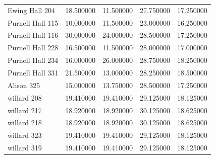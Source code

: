 \documentclass[conference]{IEEEtran}
\begin{document}
\begin{tabular}{lrrrr}
    Ewing Hall 204 & 18.500000 & 11.500000 & 27.750000 & 17.250000 \\
    Purnell Hall 115 & 10.000000 & 11.500000 & 23.000000 & 16.250000 \\
    Purnell Hall 116 & 30.000000 & 24.000000 & 28.500000 & 17.250000 \\
    Purnell Hall 228 & 16.500000 & 11.500000 & 28.000000 & 17.000000 \\
    Purnell Hall 234 & 16.000000 & 26.000000 & 28.750000 & 18.250000 \\
    Purnell Hall 331 & 21.500000 & 13.000000 & 28.250000 & 18.500000 \\
    Alison 325 & 15.000000 & 13.750000 & 28.500000 & 17.250000 \\
    willard 208 & 19.410000 & 19.410000 & 29.125000 & 18.125000 \\
    willard 217 & 18.920000 & 18.920000 & 30.125000 & 18.625000 \\
    willard 218 & 18.920000 & 18.920000 & 30.125000 & 18.625000 \\
    willard 323 & 19.410000 & 19.410000 & 29.125000 & 18.125000 \\
    willard 319 & 19.410000 & 19.410000 & 29.125000 & 18.125000 \\
    \bottomrule
\end{tabular}    
\twocolumn
\clearpage
\end{document}
